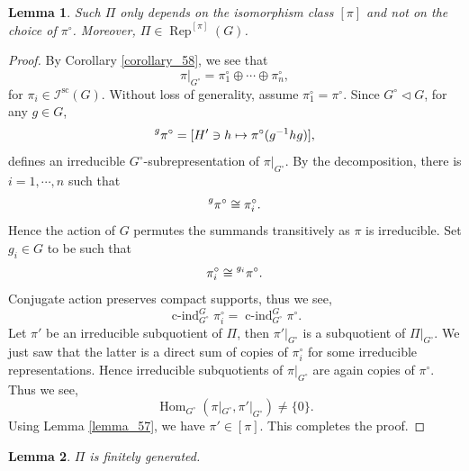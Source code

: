 \documentclass[8pt]{article}
\newtheorem{lemma}{Lemma}[section]
\DeclareMathOperator{\cind}{c-ind}
\DeclareMathOperator{\Rep}{Rep}
\DeclareMathOperator{\Hom}{Hom}
\DeclareMathOperator{\supcus}{sc}
\begin{document}
\begin{lemma}
  \label{lemma_62}
  Such $\Pi$ only depends on the isomorphism class $[\pi]$ and not on the choice of $\pi^\circ$. Moreover, $\Pi\in\Rep^{[\pi]}(G)$.
\end{lemma}
\begin{proof}
  By Corollary \ref{corollary_58}, we see that 
  \begin{equation*}
    \pi|_{G^\circ} = \pi^\circ_1\oplus\cdots\oplus\pi^\circ_n,
  \end{equation*}
  for $\pi_i\in\mathcal{I}^{\supcus}(G)$. Without loss of generality, assume $\pi_1^\circ = \pi^\circ$. Since $G^\circ\triangleleft G$, for any $g\in G$,
  \begin{equation*}
    \prescript{g}{}{\pi^\circ} = [H'\ni h\mapsto \pi^\circ(g^{-1}hg)],
  \end{equation*}
  defines an irreducible $G^\circ$-subrepresentation of $\pi|_{G^\circ}$. By the decomposition, there is $i=1,\cdots,n$ such that 
  \begin{equation*}
    \prescript{g}{}{\pi^\circ} \cong \pi_i^\circ.
  \end{equation*}
  Hence the action of $G$ permutes the summands transitively as $\pi$ is irreducible. Set $g_i\in G$ to be such that 
  \begin{equation*}
    \pi_i^\circ \cong \prescript{g_i}{}{\pi^\circ}.
  \end{equation*}
  Conjugate action preserves compact supports, thus we see,
  \begin{equation*}
    \cind_{G^\circ}^G\pi_i^\circ = \cind_{G^\circ}^G\pi^\circ.
  \end{equation*}
  Let $\pi'$ be an irreducible subquotient of $\Pi$, then $\pi'|_{G^\circ}$ is a subquotient of $\Pi|_{G^\circ}$. We just saw that the latter is a direct sum of copies of $\pi_i^\circ$ for some irreducible representations. Hence irreducible subquotients of $\pi|_{G^\circ}$ are again copies of $\pi^\circ$. Thus we see,
  \begin{equation*}
    \Hom_{G^\circ}(\pi|_{G^\circ},\pi'|_{G^\circ})\not=\{0\}.
  \end{equation*}
  Using Lemma \ref{lemma_57}, we have $\pi'\in[\pi]$. This completes the proof.
\end{proof}
\begin{lemma}
  $\Pi$ is finitely generated.
  \label{lemma_63}
\end{lemma}
\end{document}
